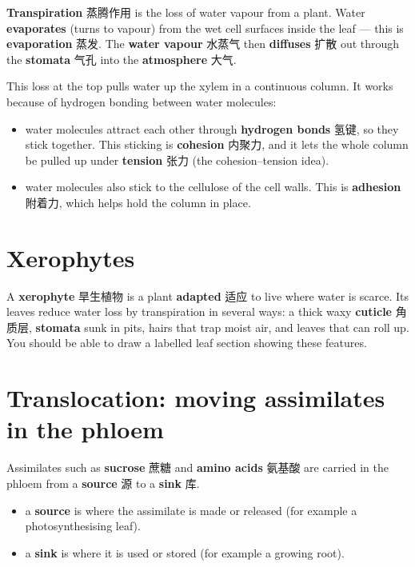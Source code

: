 \documentclass[11pt]{article}
\begin{document}
\textbf{Transpiration} 蒸腾作用 is the loss of water vapour from a plant. Water \textbf{evaporates} (turns to vapour) from the wet cell surfaces inside the leaf — this is \textbf{evaporation} 蒸发. The \textbf{water vapour} 水蒸气 then \textbf{diffuses} 扩散 out through the \textbf{stomata} 气孔 into the \textbf{atmosphere} 大气.

This loss at the top pulls water up the xylem in a continuous column. It works because of hydrogen bonding between water molecules:

\begin{itemize}
\item water molecules attract each other through \textbf{hydrogen bonds} 氢键, so they stick together. This sticking is \textbf{cohesion} 内聚力, and it lets the whole column be pulled up under \textbf{tension} 张力 (the cohesion–tension idea).

\item water molecules also stick to the cellulose of the cell walls. This is \textbf{adhesion} 附着力, which helps hold the column in place.

\end{itemize}

\section*{Xerophytes}

A \textbf{xerophyte} 旱生植物 is a plant \textbf{adapted} 适应 to live where water is scarce. Its leaves reduce water loss by transpiration in several ways: a thick waxy \textbf{cuticle} 角质层, \textbf{stomata} sunk in pits, hairs that trap moist air, and leaves that can roll up. You should be able to draw a labelled leaf section showing these features.

\section*{Translocation: moving assimilates in the phloem}

Assimilates such as \textbf{sucrose} 蔗糖 and \textbf{amino acids} 氨基酸 are carried in the phloem from a \textbf{source} 源 to a \textbf{sink} 库.

\begin{itemize}
\item a \textbf{source} is where the assimilate is made or released (for example a photosynthesising leaf).

\item a \textbf{sink} is where it is used or stored (for example a growing root).

\end{itemize}
\end{document}

